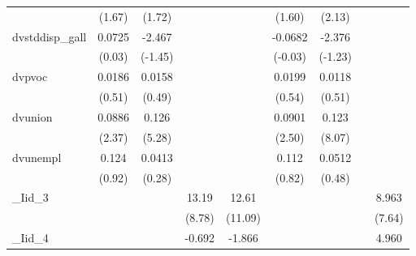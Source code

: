 {\begin{tabular}{l*{8}{c}}
            &      (1.67)         &      (1.72)         &                     &                     &      (1.60)         &      (2.13)         &                     &                     \\
[1em]
dvstddisp\_gall&      0.0725         &      -2.467         &                     &                     &     -0.0682         &      -2.376         &                     &                     \\
            &      (0.03)         &     (-1.45)         &                     &                     &     (-0.03)         &     (-1.23)         &                     &                     \\
[1em]
dvpvoc      &      0.0186         &      0.0158         &                     &                     &      0.0199         &      0.0118         &                     &                     \\
            &      (0.51)         &      (0.49)         &                     &                     &      (0.54)         &      (0.51)         &                     &                     \\
[1em]
dvunion     &      0.0886\sym{*}  &       0.126\sym{***}&                     &                     &      0.0901\sym{*}  &       0.123\sym{***}&                     &                     \\
            &      (2.37)         &      (5.28)         &                     &                     &      (2.50)         &      (8.07)         &                     &                     \\
[1em]
dvunempl    &       0.124         &      0.0413         &                     &                     &       0.112         &      0.0512         &                     &                     \\
            &      (0.92)         &      (0.28)         &                     &                     &      (0.82)         &      (0.48)         &                     &                     \\
[1em]
\_Iid\_3      &                     &                     &       13.19\sym{***}&       12.61\sym{***}&                     &                     &                     &       8.963\sym{***}\\
            &                     &                     &      (8.78)         &     (11.09)         &                     &                     &                     &      (7.64)         \\
[1em]
\_Iid\_4      &                     &                     &      -0.692         &      -1.866         &                     &                     &                     &       4.960\sym{**} \\

\end{tabular}}
